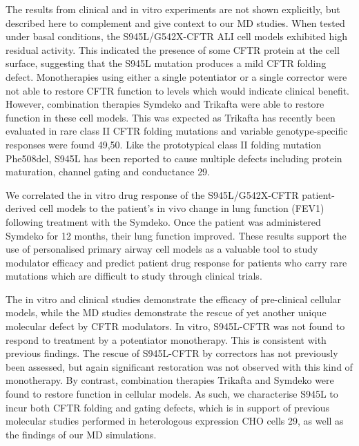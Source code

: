The results from clinical and in vitro experiments are not shown explicitly, but described here to complement and give context to our MD studies. When tested under basal conditions, the S945L/G542X-CFTR ALI cell models exhibited high residual activity. This indicated the presence of some CFTR protein at the cell surface, suggesting that the S945L mutation produces a mild CFTR folding defect. Monotherapies using either a single potentiator or a single corrector were not able to restore CFTR function to levels which would indicate clinical benefit. However, combination therapies Symdeko and Trikafta were able to restore function in these cell models. This was expected as Trikafta has recently been evaluated in rare class II CFTR folding mutations and variable genotype-specific responses were found \cite{veit2020, laselva2021}49,50. Like the prototypical class II folding mutation Phe508del, S945L has been reported to cause multiple defects including protein maturation, channel gating and conductance \cite{seibert1996}29. 

We correlated the in vitro drug response of the S945L/G542X-CFTR patient-derived cell models to the patient’s in vivo change in lung function (FEV1) following treatment with the Symdeko. Once the patient was administered Symdeko for 12 months, their lung function improved. These results support the use of personalised primary airway cell models as a valuable tool to study modulator efficacy and predict patient drug response for patients who carry rare mutations which are difficult to study through clinical trials. 

The in vitro and clinical studies demonstrate the efficacy of pre-clinical cellular models, while the MD studies demonstrate the rescue of yet another unique molecular defect by CFTR modulators.  
In vitro, S945L-CFTR was not found to respond to treatment by a potentiator monotherapy. This is consistent with previous findings. The rescue of S945L-CFTR by correctors has not previously been assessed, but again significant restoration was not observed with this kind of monotherapy. By contrast, combination therapies Trikafta and Symdeko were found to restore function in cellular models. As such, we characterise S945L to incur both CFTR folding and gating defects, which is in support of previous molecular studies performed in heterologous expression CHO cells \cite{seibert1996}29, as well as the findings of our MD simulations.

